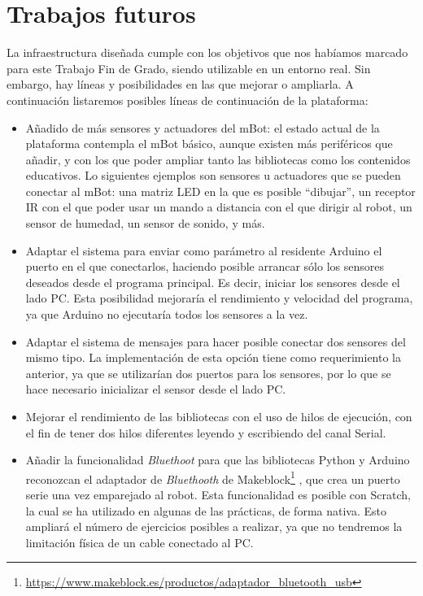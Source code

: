 \section{Trabajos futuros}
La infraestructura diseñada cumple con los objetivos que nos habíamos marcado para este Trabajo Fin de Grado, siendo utilizable en un entorno real. Sin embargo, hay líneas y posibilidades en las que mejorar o ampliarla. A continuación listaremos posibles líneas de continuación de la plataforma:
\begin{itemize}
	\item Añadido de más sensores y actuadores del mBot: el estado actual de la plataforma contempla el mBot básico, aunque existen más periféricos que añadir, y con los que poder ampliar tanto las bibliotecas como los contenidos educativos. Lo siguientes ejemplos son sensores u actuadores que se pueden conectar al mBot: una matriz LED en la que es posible ``dibujar'', un receptor IR con el que poder usar un mando a distancia con el que dirigir al robot, un sensor de humedad, un sensor de sonido, y más.
	\item Adaptar el sistema para enviar como parámetro al residente Arduino el puerto en el que conectarlos, haciendo posible arrancar sólo los sensores deseados desde el programa principal. Es decir, iniciar los sensores desde el lado PC. Esta posibilidad mejoraría el rendimiento y velocidad del programa, ya que Arduino no ejecutaría todos los sensores a la vez.
	\item Adaptar el sistema de mensajes para hacer posible conectar dos sensores del mismo tipo. La implementación de esta opción tiene como requerimiento la anterior, ya que se utilizarían dos puertos para los sensores, por lo que se hace necesario inicializar el sensor desde el lado PC.
	\item Mejorar el rendimiento de las bibliotecas con el uso de hilos de ejecución, con el fin de tener dos hilos diferentes leyendo y escribiendo del canal Serial.
	\item Añadir la funcionalidad \textit{Bluethoot} para que las bibliotecas Python y Arduino reconozcan el adaptador de \textit{Bluethooth} de Makeblock\footnote{\href{https://www.makeblock.es/productos/adaptador_bluetooth_usb}{https://www.makeblock.es/productos/adaptador\_bluetooth\_usb}}
	, que crea un puerto serie una vez emparejado al robot. Esta funcionalidad es posible con Scratch, la cual se ha utilizado en algunas de las prácticas, de forma nativa. Esto ampliará el número de ejercicios posibles a realizar, ya que no tendremos la limitación física de un cable conectado al PC.
\end{itemize} 
